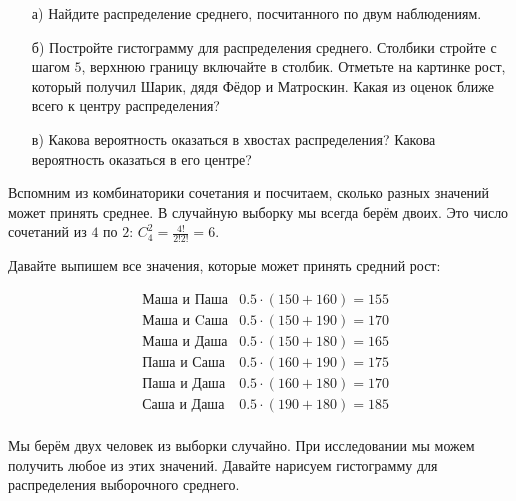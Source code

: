 \documentclass[12pt, a4paper, oneside]{article}
\begin{document}
\begin{enumerate} 
	\item[а)] Найдите распределение среднего, посчитанного по двум наблюдениям. 
	\item[б)]  Постройте гистограмму для распределения среднего. Столбики стройте с шагом $5$, верхнюю границу включайте в столбик. Отметьте на картинке рост, который получил Шарик, дядя Фёдор и Матроскин. Какая из оценок ближе всего к центру распределения? 
	\item[в)] Какова вероятность оказаться в хвостах распределения? Какова вероятность оказаться в его центре? 
\end{enumerate} 

\begin{sol}
Вспомним из комбинаторики сочетания и посчитаем, сколько разных значений может принять среднее. В случайную выборку мы всегда берём двоих. Это число сочетаний из $4$ по $2$:  $C_4^2 = \frac{4!}{2!2!} =  6$.

Давайте выпишем все значения, которые может принять средний рост: 

\begin{equation*}
\begin{aligned}
& \text{Маша и Паша}  & 0.5 \cdot (150 + 160) = 155 \\
& \text{Маша и Cаша}  & 0.5 \cdot (150 + 190) = 170 \\
& \text{Маша и Даша}  & 0.5 \cdot (150 + 180) = 165 \\
& \text{Паша и Саша}  & 0.5 \cdot (160 + 190) = 175 \\
& \text{Паша и Даша}  & 0.5 \cdot (160 + 180) =  170 \\
& \text{Саша и Даша}  & 0.5 \cdot (190 + 180) =  185 \\
\end{aligned} 
\end{equation*}

Мы берём двух человек из выборки случайно. При исследовании мы можем получить любое из этих значений.  Давайте нарисуем гистограмму для  распределения выборочного среднего. 


\end{sol}
\end{document}
